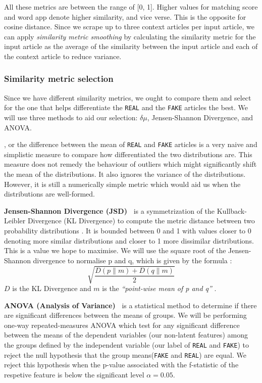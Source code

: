 \documentclass{article}
\begin{document}
All these metrics are between the range of [0, 1]. Higher values for matching score and word app denote higher similarity, and vice verse. This is the opposite for cosine distance. Since we scrape up to three context articles per input article, we can apply \emph{similarity metric smoothing} by calculating the similarity metric for the input article as the average of the similarity between the input article and each of the context article to reduce variance.

\subsubsection{Similarity metric selection}\label{section:similarity-metric-selection}
Since we have different similarity metrics, we ought to compare them and select for the one that helps differentiate the \texttt{REAL} and the \texttt{FAKE} articles the best. We will use three methods to aid our selection: $\delta \mu$, Jensen-Shannon Divergence, and ANOVA.

\boldsymbol{$\delta \mu$}, or the difference between the mean of \texttt{REAL} and \texttt{FAKE} articles is a very naive and simplistic measure to compare how differentiated the two distributions are. This measure does not remedy the behaviour of outliers which might significantly shift the mean of the distributions. It also ignores the variance of the distributions. However, it is still a numerically simple metric which would aid us when the distributions are well-formed.

\textbf{Jensen-Shannon Divergence (JSD)~\cite{jsd}} is a symmetrization of the Kullback-Leibler Divergence (KL Divergence) to compute the metric distance between two probability distributions \cite{scipy, jsd}. It is bounded between 0 and 1 with values closer to 0 denoting more similar distributions and closer to 1 more dissimilar distributions. This is a value we hope to maximise. We will use the square root of the Jensen-Shannon divergence to normalise p and q, which is given by the formula \cite{scipy}:
\[\sqrt{\frac{D(p \parallel m) + D(q \parallel m)}{2}}\]
$D$ is the KL Divergence and $m$ is the \emph{``point-wise mean of p and q''} \cite{scipy}.

\textbf{ANOVA (Analysis of Variance)~\cite{anova}} is a statistical method to determine if there are significant differences between the means of groups. We will be performing one-way repeated-measures ANOVA which test for any significant difference between the means of the dependent variables (our non-latent features) among the groups defined by the independent variable (our label of \texttt{REAL} and \texttt{FAKE}) to reject the null hypothesis that the group means(\texttt{FAKE} and \texttt{REAL}) are equal. We reject this hypothesis when the p-value associated with the f-statistic of the respetive feature is below the significant level $\alpha = 0.05$.
\end{document}
